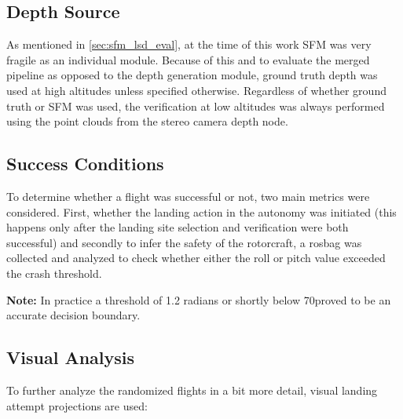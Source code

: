 \subsection{Depth Source}
As mentioned in \cref{sec:sfm_lsd_eval}, at the time of this work SFM was very fragile as an individual module. Because of this and to evaluate the merged pipeline as opposed to the depth generation module, ground truth depth was used at high altitudes unless specified otherwise. Regardless of whether ground truth or SFM was used, the verification at low altitudes was always performed using the point clouds from the stereo camera depth node.

\subsection{Success Conditions}
To determine whether a flight was successful or not, two main metrics were considered. First, whether the landing action in the autonomy was initiated (this happens only after the landing site selection and verification were both successful) and secondly to infer the safety of the rotorcraft, a rosbag was collected and analyzed to check whether either the roll or pitch value exceeded the crash threshold.

\textbf{Note: } In practice a threshold of 1.2 radians or shortly below 70\degree proved to be an accurate decision boundary.

\subsection{Visual Analysis}
To further analyze the randomized flights in a bit more detail, visual landing attempt projections are used:

